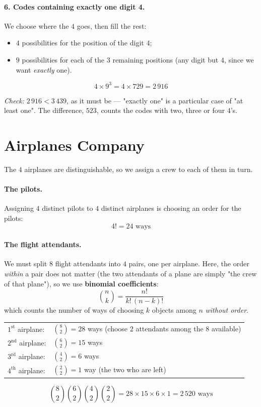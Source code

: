 \documentclass[]{article}
\begin{document}
	\paragraph{6. Codes containing exactly one digit 4.}
	We choose where the $4$ goes, then fill the rest:
	\begin{itemize}
		\item $4$ possibilities for the position of the digit $4$;
		\item $9$ possibilities for each of the $3$ remaining positions (any digit but $4$, since we want \textit{exactly} one).
	\end{itemize}
	$$
	4 \times 9^3 = 4 \times 729 = \boxed{2\,916}
	$$

	\textit{Check:} $2\,916 < 3\,439$, as it must be --- "exactly one" is a particular case of "at least one".
	The difference, $523$, counts the codes with two, three or four $4$'s.


	\section{Airplanes Company}

	The $4$ airplanes are distinguishable, so we assign a crew to each of them in turn.

	\paragraph{The pilots.}
	Assigning $4$ distinct pilots to $4$ distinct airplanes is choosing an order for the pilots:
	$$
	4! = 24 \text{ ways}
	$$

	\paragraph{The flight attendants.}
	We must split $8$ flight attendants into $4$ pairs, one per airplane.
	Here, the order \textit{within} a pair does not matter (the two attendants of a plane are simply "the crew of that plane"), so we use \textbf{binomial coefficients}:
	$$
	\binom{n}{k} = \frac{n!}{k! \, (n-k)!}
	$$
	which counts the number of ways of choosing $k$ objects among $n$ \textit{without order}.
	\begin{center}
		\begin{tabular}{ll}
			$1^{\text{st}}$ airplane: & $\binom{8}{2} = 28$ ways (choose $2$ attendants among the $8$ available) \\[4pt]
			$2^{\text{nd}}$ airplane: & $\binom{6}{2} = 15$ ways \\[4pt]
			$3^{\text{rd}}$ airplane: & $\binom{4}{2} = 6$ ways \\[4pt]
			$4^{\text{th}}$ airplane: & $\binom{2}{2} = 1$ way (the two who are left)
		\end{tabular}
	\end{center}
	$$
	\binom{8}{2}\binom{6}{2}\binom{4}{2}\binom{2}{2} = 28 \times 15 \times 6 \times 1 = 2\,520 \text{ ways}
	$$
\end{document}
